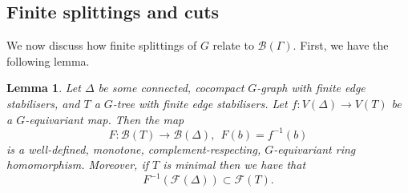 \documentclass[11pt,a4paper]{amsart}
\newcommand{\into}{\hookrightarrow}
\newtheorem{lemma}[theorem]{Lemma}
\theoremstyle{definition}
\newcommand{\br}{{\mathscr{B}}}
\begin{document}
\subsection{Finite splittings and cuts}

We now discuss how finite splittings of $G$ relate to $\br(\Gamma)$. 
First, we have the following lemma. 

\begin{lemma}\label{lem:br-hom-well-defined}
    Let $\Delta$ be some connected, cocompact $G$-graph with finite edge stabilisers, and $T$ a $G$-tree with finite edge stabilisers. Let $f : V(\Delta) \to V(T)$ be a $G$-equivariant map. Then the map
    $$
    F: \br(T) \to \br(\Delta), \ \ F(b) = f^{-1}(b)
    $$
    is a well-defined, monotone, complement-respecting, $G$-equivariant ring homomorphism.
    Moreover, if $T$ is minimal then we have that 
    $$
    F^{-1}(\mathscr F(\Delta)) \subset \mathscr F(T).
    $$
\end{lemma}
\end{document}
